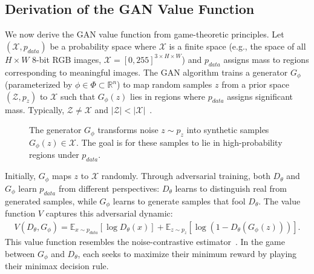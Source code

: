 \subsection{Derivation of the GAN Value Function}%
\label{sec:derivation}
We now derive the GAN value function from game-theoretic principles. Let $(\mathcal{X}, p_{data})$ be a probability space where $\mathcal{X}$ is a finite space (e.g., the space of all $H \times W$ 8-bit RGB images, $\mathcal{X} = [0, 255]^{3 \times H \times W}$) and $p_{data}$ assigns mass to regions corresponding to meaningful images.
The GAN algorithm trains a generator $G_\phi$ (parameterized by $\phi \in \Phi \subset \mathbb{R}^n$) to map random samples $z$ from a prior space $(\mathcal{Z}, p_z)$ to $\mathcal{X}$ such that $G_\phi(z)$ lies in regions where $p_{data}$ assigns significant mass. Typically, $\mathcal{Z} \neq \mathcal{X}$ and $|\mathcal{Z}| < |\mathcal{X}|$~\cite{ref:arjovsky-2017}.
\begin{figure}[H]
	\centering
	\caption{The generator $G_\phi$ transforms noise $z \sim p_z$ into synthetic samples $G_\phi(z) \in \mathcal{X}$. The goal is for these samples to lie in high-probability regions under $p_{data}$.}%
	\label{fig:g-maps}
\end{figure}
Initially, $G_\phi$ maps $z$ to $\mathcal{X}$ randomly. Through adversarial training, both $D_\theta$ and $G_\phi$ learn $p_{data}$ from different perspectives: $D_\theta$ learns to distinguish real from generated samples, while $G_\phi$ learns to generate samples that fool $D_\theta$.
The value function $V$ captures this adversarial dynamic:
\begin{align}
	\label{eq:the-original-objective-function}
	V(D_\theta, G_\phi) = \mathbb{E}_{x \sim p_{data}}[\log D_\theta(x)] + \mathbb{E}_{z \sim p_z}[\log(1 - D_\theta(G_\phi(z)))].
\end{align}
This value function resembles the noise-contrastive estimator~\cite{ref:gutmann-2010}. In the game between $G_\phi$ and $D_\theta$, each seeks to maximize their minimum reward by playing their minimax decision rule.
